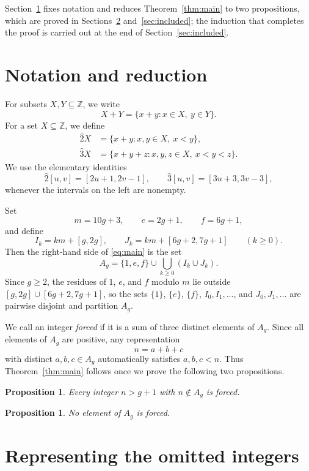 \documentclass[12pt]{article}
\newtheorem{proposition}[theorem]{Proposition}
\newcommand{\hsum}[1]{\widehat{#1}}
\begin{document}
Section~\ref{sec:prelim} fixes notation and reduces Theorem~\ref{thm:main} to two propositions, which are proved in Sections~\ref{sec:omitted} and~\ref{sec:included}; the induction that completes the proof is carried out at the end of Section~\ref{sec:included}.

\section{Notation and reduction}\label{sec:prelim}

For subsets $X,Y\subseteq\mathbb Z$, we write
\[
X+Y=\{x+y : x\in X,\ y\in Y\}.
\]
For a set $X\subseteq\mathbb Z$, we define
\[
\begin{aligned}
\hsum{2}X &= \{x+y : x,y\in X,\ x<y\}, \\
\hsum{3}X &= \{x+y+z : x,y,z\in X,\ x<y<z\}.
\end{aligned}
\]
We use the elementary identities
\begin{equation}\label{eq:hat-identities}
\hsum{2}[u,v]=[2u+1,2v-1],
\qquad
\hsum{3}[u,v]=[3u+3,3v-3],
\end{equation}
whenever the intervals on the left are nonempty.

Set
\[
 m=10g+3,
 \qquad
 e=2g+1,
 \qquad
 f=6g+1,
\]
and define
\[
 I_k=km+[g,2g],
 \qquad
 J_k=km+[6g+2,7g+1]
 \qquad
 (k\ge 0).
\]
Then the right-hand side of \eqref{eq:main} is the set
\[
 A_g=\{1,e,f\}\cup\bigcup_{k\ge 0}(I_k\cup J_k).
\]
Since $g\ge 2$, the residues of $1$, $e$, and $f$ modulo $m$ lie outside $[g,2g]\cup[6g+2,7g+1]$, so the sets $\{1\}$, $\{e\}$, $\{f\}$, $I_0,I_1,\ldots$, and $J_0,J_1,\ldots$ are pairwise disjoint and partition $A_g$.

We call an integer \emph{forced} if it is a sum of three distinct elements of $A_g$. Since all elements of $A_g$ are positive, any representation
\[
 n=a+b+c
\]
with distinct $a,b,c\in A_g$ automatically satisfies $a,b,c<n$. Thus Theorem~\ref{thm:main} follows once we prove the following two propositions.

\begin{proposition}\label{prop:omitted}
Every integer $n>g+1$ with $n\notin A_g$ is forced.
\end{proposition}

\begin{proposition}\label{prop:included}
No element of $A_g$ is forced.
\end{proposition}

\section{Representing the omitted integers}\label{sec:omitted}
\end{document}
